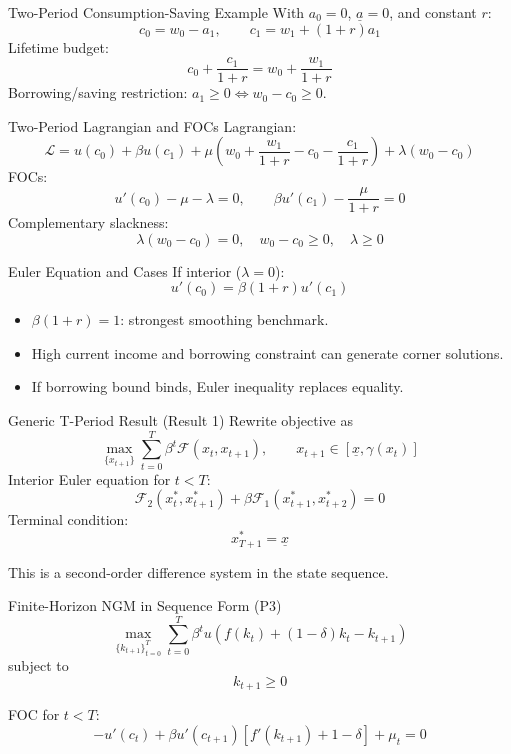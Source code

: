 \documentclass[aspectratio=169,10pt]{beamer}
\newcommand{\apxbutton}[1]{\hfill\hyperlink{#1}{\beamerbutton{Appendix}}}
\begin{document}
\begin{frame}{Two-Period Consumption-Saving Example}
\hypertarget{m-a2}{}
With $a_0=0$, $\underline{a}=0$, and constant $r$:
\[
c_0=w_0-a_1,\qquad c_1=w_1+(1+r)a_1
\]
Lifetime budget:
\[
c_0+\frac{c_1}{1+r}=w_0+\frac{w_1}{1+r}
\]
Borrowing/saving restriction: $a_1\ge 0 \Leftrightarrow w_0-c_0\ge 0$.
\apxbutton{a2}
\end{frame}

\begin{frame}{Two-Period Lagrangian and FOCs}
Lagrangian:
\[
\mathcal{L}=u(c_0)+\beta u(c_1)+\mu\left(w_0+\frac{w_1}{1+r}-c_0-\frac{c_1}{1+r}\right)+\lambda(w_0-c_0)
\]
FOCs:
\[
u'(c_0)-\mu-\lambda=0,
\qquad
\beta u'(c_1)-\frac{\mu}{1+r}=0
\]
Complementary slackness:
\[
\lambda(w_0-c_0)=0,\quad w_0-c_0\ge 0,\quad \lambda\ge 0
\]
\end{frame}

\begin{frame}{Euler Equation and Cases}
If interior ($\lambda=0$):
\[
u'(c_0)=\beta(1+r)u'(c_1)
\]

\begin{itemize}
  \item $\beta(1+r)=1$: strongest smoothing benchmark.
  \item High current income and borrowing constraint can generate corner solutions.
  \item If borrowing bound binds, Euler inequality replaces equality.
\end{itemize}
\end{frame}

\begin{frame}{Generic T-Period Result (Result 1)}
Rewrite objective as
\[
\max_{\{x_{t+1}\}}\sum_{t=0}^{T}\beta^t\mathcal{F}(x_t,x_{t+1}),\qquad x_{t+1}\in[\underline{x},\gamma(x_t)]
\]
Interior Euler equation for $t<T$:
\[
\mathcal{F}_2(x_t^*,x_{t+1}^*)+\beta\mathcal{F}_1(x_{t+1}^*,x_{t+2}^*)=0
\]
Terminal condition:
\[
x_{T+1}^*=\underline{x}
\]

\medskip
This is a second-order difference system in the state sequence.
\end{frame}

\begin{frame}{Finite-Horizon NGM in Sequence Form (P3)}
\hypertarget{m-a3}{}
\[
\max_{\{k_{t+1}\}_{t=0}^{T}}\sum_{t=0}^{T}\beta^t u\left(f(k_t)+(1-\delta)k_t-k_{t+1}\right)
\]
subject to
\[
k_{t+1}\ge 0
\]

FOC for $t<T$:
\[
-u'(c_t)+\beta u'(c_{t+1})\left[f'(k_{t+1})+1-\delta\right]+\mu_t=0
\]
\apxbutton{a3}
\end{frame}
\end{document}
